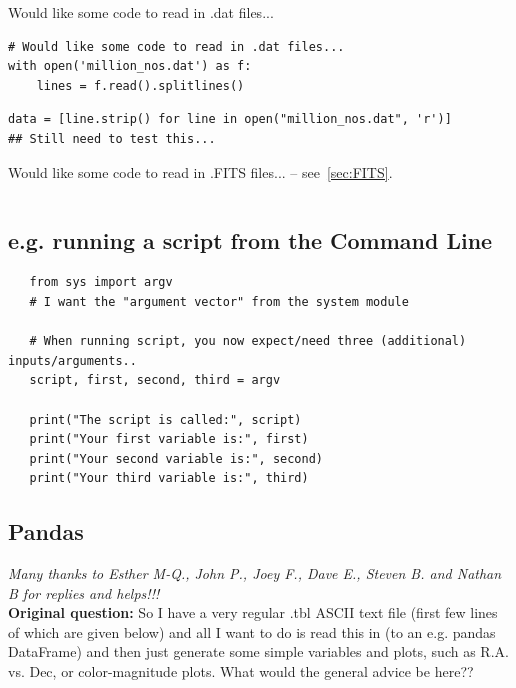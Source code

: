\documentclass[11pt,a4paper]{article}
\begin{document}
Would like some code to read in .dat files...
\begin{lstlisting}
# Would like some code to read in .dat files...
with open('million_nos.dat') as f:
    lines = f.read().splitlines()
\end{lstlisting}

\begin{lstlisting}
data = [line.strip() for line in open("million_nos.dat", 'r')]
## Still need to test this...
\end{lstlisting}


\smallskip
\smallskip
\noindent 
Would like some code to read in .FITS files... -- see~\ref{sec:FITS}. 
\begin{lstlisting}
\end{lstlisting}


    \subsection{e.g. running a script from the Command Line}
    \begin{lstlisting}
   from sys import argv
   # I want the "argument vector" from the system module

   # When running script, you now expect/need three (additional) inputs/arguments..
   script, first, second, third = argv

   print("The script is called:", script)
   print("Your first variable is:", first)
   print("Your second variable is:", second)
   print("Your third variable is:", third)
   \end{lstlisting}


\newpage
    \subsection{Pandas}

    \smallskip
    \noindent
    {\it Many thanks to Esther M-Q., John P., Joey F., Dave E., Steven B. and Nathan B 
    for replies and helps!!!}\\

    \smallskip
    \noindent
    {\bf Original question:} So I have a very regular .tbl ASCII text
    file (first few lines of which are given below) and all I want to do
    is read this in (to an e.g. pandas DataFrame) and then just generate
    some simple variables and plots, such as R.A. vs. Dec, or
    color-magnitude plots. What would the general advice be here??\\
\end{document}
